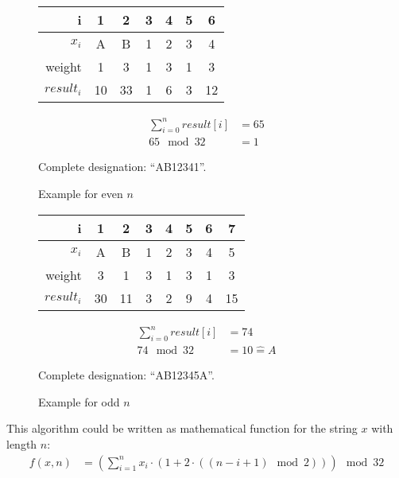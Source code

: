 \begin{multicols}{2}
	\begin{figure}[H]
		\centering

		\begin{tabular}{r|c|c|c|c|c|c}
			i          & 1  & 2  & 3 & 4 & 5 & 6 \\
			\hline
			$x_i$      & A  & B  & 1 & 2 & 3 & 4 \\
			weight     & 1  & 3  & 1 & 3 & 1 & 3 \\
			\hline
			$result_i$ & 10 & 33 & 1 & 6 & 3 & 12 \\
		\end{tabular}

		\begin{align*}
			\sum_{i=0}^{n} result[i] &= 65 \\
			65 \mod 32 &= 1
		\end{align*}

		Complete designation: ``AB12341''.

		\caption{Example for even $n$}
	\end{figure}

	\begin{figure}[H]
		\centering

		\begin{tabular}{r|c|c|c|c|c|c|c}
			i          & 1  & 2  & 3 & 4 & 5 & 6 & 7 \\
			\hline
			$x_i$      & A  & B  & 1 & 2 & 3 & 4 & 5 \\
			weight     & 3  & 1  & 3 & 1 & 3 & 1 & 3 \\
			\hline
			$result_i$ & 30 & 11 & 3 & 2 & 9 & 4 & 15 \\
		\end{tabular}

		\begin{align*}
			\sum_{i=0}^{n} result[i] &= 74 \\
			74 \mod 32 &= 10 \hat{=} A
		\end{align*}

		Complete designation: ``AB12345A''.

		\caption{Example for odd $n$}
	\end{figure}
\end{multicols}


This algorithm could be written as mathematical function for the string $x$ with
length $n$:
\begin{align*}
	f(x, n) &= \left(\sum_{i=1}^{n} x_i \cdot \left(1 + 2 \cdot \left( \left(
		n - i + 1 \right) \mod 2 \right) \right) \right) \mod 32
\end{align*}
